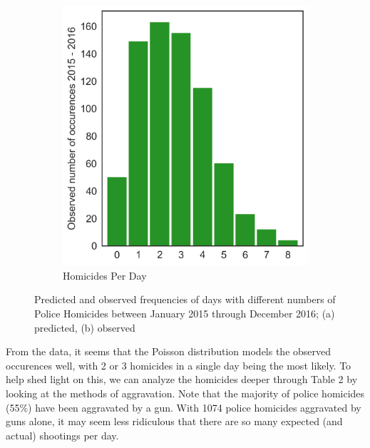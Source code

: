 \documentclass[12pt, titlepage]{article}
\begin{document}
\begin{figure}[ht!]
\begin{subfigure}[t]{0.5\textwidth}
        \includegraphics[width=.9\textwidth]{assets/day_frequency_poisson_(iiib).png}
        \caption{Homicides Per Day}
    \end{subfigure}
    \caption{Predicted and observed frequencies of days with different numbers of Police Homicides between January 2015 through December 2016; (a) predicted, (b) observed}
\end{figure}

From the data, it seems that the Poisson distribution models the observed occurences well, with 2 or 3 homicides in a single day being the most likely. To help shed light on this, we can analyze the homicides deeper through Table 2 by looking at the methods of aggravation. Note that the majority of police homicides (55\%) have been aggravated by a gun. With 1074 police homicides aggravated by guns alone, it may seem less ridiculous that there are so many expected (and actual) shootings per day.
\pagebreak

\end{document}
